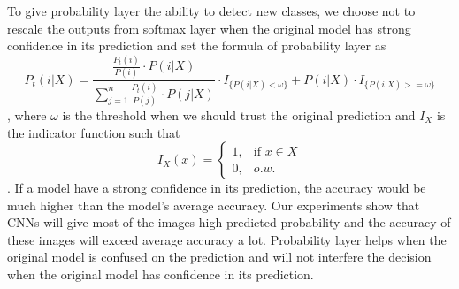 \documentclass{article}
\begin{document}
To give probability layer the ability to detect new classes, we choose not to rescale the outputs from softmax layer when the original model has strong confidence in its prediction and set the formula of probability layer as
\begin{equation}
    P_t(i|X) = \frac{\frac{P_t(i)}{P(i)} \cdot P(i|X)}{\sum_{j=1}^n \frac{P_t(i)}{P(j)} \cdot P(j|X)} \cdot I_{\{P(i|X) < \omega\}} + P(i|X) \cdot I_{\{P(i|X) >= \omega\}}
\end{equation}
, where $\omega$ is the threshold when we should trust the original prediction and $I_X$ is the indicator function such that
\begin{equation}
I_X(x) = \begin{cases}
1, &\text{if $x \in X$}\\
0, &\text{$o.w.$}
\end{cases}
\end{equation}
. If a model have a strong confidence in its prediction, the accuracy would be much higher than the model's average accuracy. Our experiments show that CNNs will give most of the images high predicted probability and the accuracy of these images will exceed average accuracy a lot. Probability layer helps when the original model is confused on the prediction and will not interfere the decision when the original model has confidence in its prediction.
\end{document}
